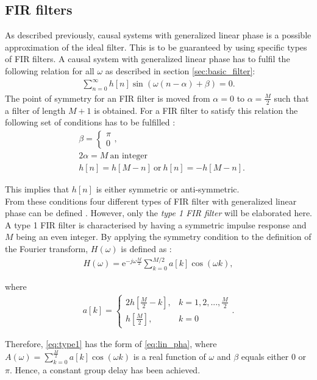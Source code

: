 \subsection{FIR filters}
As described previously, causal systems with generalized linear phase is a possible approximation of the ideal filter. This is to be guaranteed by using specific types of FIR filters. A causal system with generalized linear phase has to fulfil the following relation for all $\omega$ as described in section \ref{sec:basic_filter}:
\begin{align*}
\sum_{n=0}^{\infty}h[n]\sin\left(\omega \left(n-\alpha \right) + \beta \right) = 0.
\end{align*}
The point of symmetry for an FIR filter is moved from $\alpha=0$ to $\alpha=\frac{M}{2}$ such that a filter of length $M+1$ is obtained. For a FIR filter to satisfy this relation the following set of conditions has to be fulfilled \cite{page 341, DTSP}:
\begin{align} \label{eq:FIR_con}
&\beta = \left\{ \begin{matrix}
\pi \\
0
\end{matrix}\right., \nonumber  \\ 
&2\alpha = M \ \text{an integer} \\ 
&h[n]=h[M-n] \ \text{or} \ h[n]=-h[M-n]. \nonumber  
\end{align}

This implies that $h[n]$ is either symmetric or anti-symmetric. \\
From these conditions four different types of FIR filter with generalized linear phase can be defined \cite{pages 343-344, DTSP}. However, only the \textit{type 1 FIR filter} will be elaborated here.
A type 1 FIR filter is characterised by having a symmetric impulse response and $M$ being an even integer. By applying the symmetry condition to the definition of the Fourier transform, $H(\omega)$ is defined as \cite{page 343, DTSP}:
\begin{align} \label{eq:type1}
H(\omega) = \text{e}^{-j\omega \frac{M}{2}} \sum_{k=0}^{M/2} a[k] \cos (\omega k),
\end{align}

where 
\begin{align*}
a[k]=\begin{cases}
2h\left[ \frac{M}{2} - k \right], &k= 1,2,... ,\frac{M}{2}\\
h[\frac{M}{2}], &k=0
\end{cases}.
\end{align*}

Therefore, \eqref{eq:type1} has the form of \eqref{eq:lin_pha}, where $A(\omega) = \sum_{k=0}^{\frac{M}{2}} a[k]\cos (\omega k)$ is a real function of $\omega$ and $\beta$ equals either 0 or $\pi$. Hence, a constant group delay has been achieved.